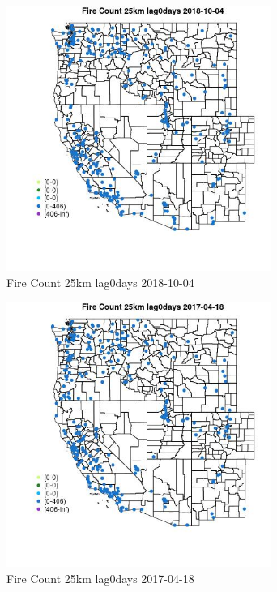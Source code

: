 \begin{figure} 
\centering  
\includegraphics[width=0.77\textwidth]{Code_Outputs/Report_ML_input_PM25_Step4_part_f_de_duplicated_aves_prioritize_24hr_obswNAs_MapObsFire_Count_25km_lag0days2018-10-04.jpg} 
\caption{\label{fig:Report_ML_input_PM25_Step4_part_f_de_duplicated_aves_prioritize_24hr_obswNAsMapObsFire_Count_25km_lag0days2018-10-04}Fire Count 25km lag0days 2018-10-04} 
\end{figure} 
 

\begin{figure} 
\centering  
\includegraphics[width=0.77\textwidth]{Code_Outputs/Report_ML_input_PM25_Step4_part_f_de_duplicated_aves_prioritize_24hr_obswNAs_MapObsFire_Count_25km_lag0days2017-04-18.jpg} 
\caption{\label{fig:Report_ML_input_PM25_Step4_part_f_de_duplicated_aves_prioritize_24hr_obswNAsMapObsFire_Count_25km_lag0days2017-04-18}Fire Count 25km lag0days 2017-04-18} 
\end{figure} 
 

